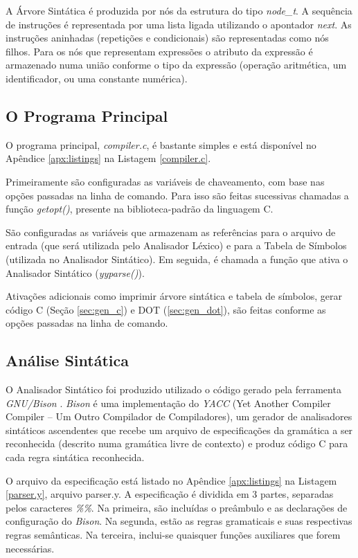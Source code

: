 A Árvore Sintática é produzida por nós da estrutura do tipo \emph{node\_t}. A
sequência de instruções é representada por uma lista ligada utilizando o
apontador \emph{next}. As instruções aninhadas (repetições e condicionais) são
representadas como nós filhos. Para os nós que representam expressões o
atributo da expressão é armazenado numa união conforme o tipo da expressão
(operação aritmética, um identificador, ou uma constante numérica).

\subsection{O Programa Principal}
O programa principal, \emph{compiler.c}, é bastante simples e está disponível
no Apêndice \ref{apx:listings} na Listagem \ref{compiler.c}.

Primeiramente são configuradas as variáveis de chaveamento, com base nas opções
passadas na linha de comando. Para isso são feitas sucessivas chamadas a
função \emph{getopt()}, presente na biblioteca-padrão da linguagem C.

São configuradas as variáveis que armazenam as referências para o arquivo de
entrada (que será utilizada pelo Analisador Léxico) e para a Tabela de
Símbolos (utilizada no Analisador Sintático). Em seguida, é chamada a função
que ativa o Analisador Sintático (\emph{yyparse()}).

Ativações adicionais como imprimir árvore sintática e tabela de símbolos,
gerar código C (Seção \ref{sec:gen_c}) e DOT (\ref{sec:gen_dot}), são feitas
conforme as opções passadas na linha de comando.


\subsection{Análise Sintática}
O Analisador Sintático foi produzido utilizado o código gerado pela ferramenta
\emph{GNU/Bison} \cite{bison}. \emph{Bison} é uma implementação do \emph{YACC}
(Yet Another Compiler Compiler {--} Um Outro Compilador de Compiladores), um
gerador de analisadores sintáticos ascendentes que recebe um arquivo de
especificações da gramática a ser reconhecida (descrito numa gramática livre
de contexto) e produz código C para cada regra sintática reconhecida.

O arquivo da especificação está listado no Apêndice \ref{apx:listings} na Listagem
\ref{parser.y}, arquivo parser.y. A especificação é dividida em 3 partes,
separadas pelos caracteres \emph{\%\%}. Na primeira, são incluídas o preâmbulo
e as declarações de configuração do \emph{Bison}. Na segunda, estão as regras
gramaticais e suas respectivas regras semânticas. Na terceira, inclui-se
quaisquer funções auxiliares que forem necessárias.

